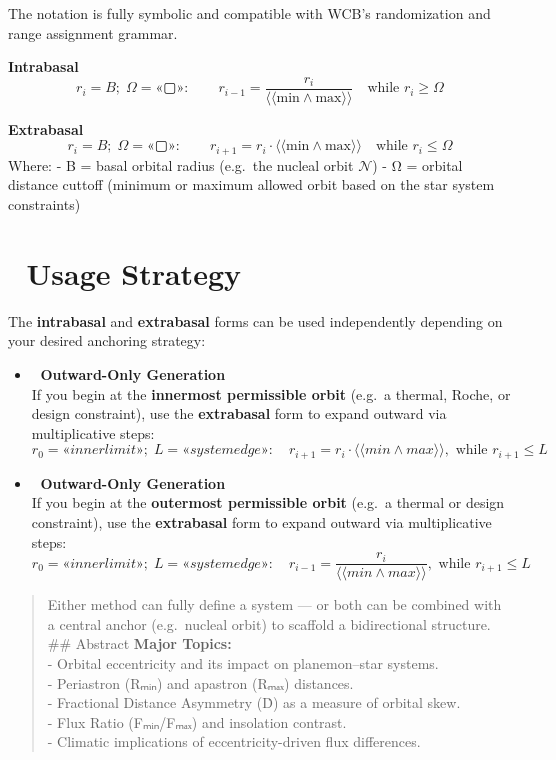 \documentclass[
  letterpaper,
]{book}
\providecommand{\tightlist}{%
  \setlength{\itemsep}{0pt}\setlength{\parskip}{0pt}}
\begin{document}
The notation is fully symbolic and compatible with WCB's randomization
and range assignment grammar.

\textbf{Intrabasal} \[
r_i = B;\; \Omega = \text{«▢»}: \qquad
r_{i-1} = \frac{r_i}{⟨⟨ \text{min} ∧ \text{max} ⟩⟩}
\quad \text{while } r_i \geq \Omega
\]

\textbf{Extrabasal} \[
r_i = B;\; \Omega = \text{«▢»}: \qquad
r_{i+1} = r_i \cdot ⟨⟨ \text{min} ∧ \text{max} ⟩⟩
\quad \text{while } r_i \leq \Omega
\] Where: - B = basal orbital radius (e.g.~the nucleal orbit
\(\mathcal{N}\)) - Ω = orbital distance cuttoff (minimum or maximum
allowed orbit based on the star system constraints)

\section{🔄 Usage Strategy}\label{usage-strategy-1}

The \textbf{intrabasal} and \textbf{extrabasal} forms can be used
independently depending on your desired anchoring strategy:

\begin{itemize}
\tightlist
\item
  🧭 \textbf{Outward-Only Generation}\\
  If you begin at the \textbf{innermost permissible orbit} (e.g.~a
  thermal, Roche, or design constraint), use the \textbf{extrabasal}
  form to expand outward via multiplicative steps: \[
  r_0 = «inner limit»;\; L = «system edge»:
  \quad r_{i+1} = r_i \cdot ⟨⟨min ∧ max⟩⟩, \text{ while } r_{i+1} \leq L
  \]
\item
  🧭 \textbf{Outward-Only Generation}\\
  If you begin at the \textbf{outermost permissible orbit} (e.g.~a
  thermal or design constraint), use the \textbf{extrabasal} form to
  expand outward via multiplicative steps: \[
  r_0 = «inner limit»;\; L = «system edge»:
  \quad r_{i-1} = \dfrac{r_i} {⟨⟨min ∧ max⟩⟩}, \text{ while } r_{i+1} \leq L
  \]
\end{itemize}

\begin{quote}
Either method can fully define a system --- or both can be combined with
a central anchor (e.g.~nucleal orbit) to scaffold a bidirectional
structure. \#\# Abstract \textbf{Major Topics:}\\
- Orbital eccentricity and its impact on planemon--star systems.\\
- Periastron (Rₘᵢₙ) and apastron (Rₘₐₓ) distances.\\
- Fractional Distance Asymmetry (Ḋ) as a measure of orbital skew.\\
- Flux Ratio (Fₘᵢₙ/Fₘₐₓ) and insolation contrast.\\
- Climatic implications of eccentricity-driven flux differences.
\end{quote}
\end{document}
